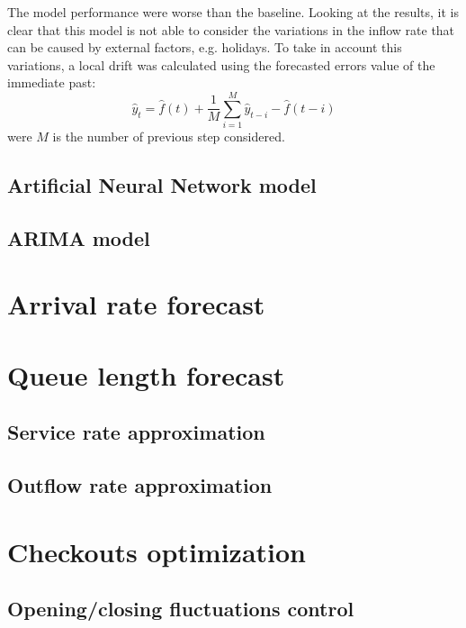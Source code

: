 The model performance were worse than the baseline. Looking at the results, it is clear that this model is not able to consider the variations in the inflow rate that can be caused by external factors, e.g. holidays. To take in account this variations, a local drift was calculated using the forecasted errors value of the immediate past:
\[ \hat{y}_t = \hat{f}(t) + \frac{1}{M} \sum_{i=1}^{M} \hat{y}_{t-i} - \hat{f}(t-i) \]
were \(M\) is the number of previous step considered.

\subsection{Artificial Neural Network model}
\label{subsec:ann_mode.}

\subsection{ARIMA model}
\label{subsec:arima_model}

\section{Arrival rate forecast}
\label{sec:arrival_rate_forecast}

\section{Queue length forecast}
\label{sec:queue_length_forecasting}

\subsection{Service rate approximation}
\label{subsec:service_rate_approximation}

\subsection{Outflow rate approximation}
\label{subsec:outflow_rate_approximation}

\section{Checkouts optimization}
\label{sec:checkouts_optimization}

\subsection{Opening/closing fluctuations control}
\label{subsec:opening_closing_fluctuations_control}